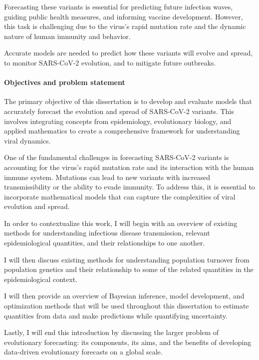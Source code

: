 Forecasting these variants is essential for predicting future infection waves, guiding public health measures, and informing vaccine development.
However, this task is challenging due to the virus's rapid mutation rate and the dynamic nature of human immunity and behavior. 

Accurate models are needed to predict how these variants will evolve and spread, to monitor SARS-CoV-2 evolution, and to mitigate future outbreaks.


\paragraph{Objectives and problem statement}

The primary objective of this dissertation is to develop and evaluate models that accurately forecast the evolution and spread of SARS-CoV-2 variants. This involves integrating concepts from epidemiology, evolutionary biology, and applied mathematics to create a comprehensive framework for understanding viral dynamics.

One of the fundamental challenges in forecasting SARS-CoV-2 variants is accounting for the virus's rapid mutation rate and its interaction with the human immune system. Mutations can lead to new variants with increased transmissibility or the ability to evade immunity. To address this, it is essential to incorporate mathematical models that can capture the complexities of viral evolution and spread.

In order to contextualize this work, I will begin with an overview of existing methods for understanding infectious disease transmission, relevant epidemiological quantities, and their relationships to one another.

I will then discuss existing methods for understanding population turnover from population genetics and their relationship to some of the related quantities in the epidemiological context.

I will then provide an overview of Bayesian inference, model development, and optimization methods that will be used throughout this dissertation to estimate quantities from data and make predictions while quantifying uncertainty.

Lastly, I will end this introduction by discussing the larger problem of evolutionary forecasting: its components, its aims, and the benefits of developing data-driven evolutionary forecasts on a global scale.

